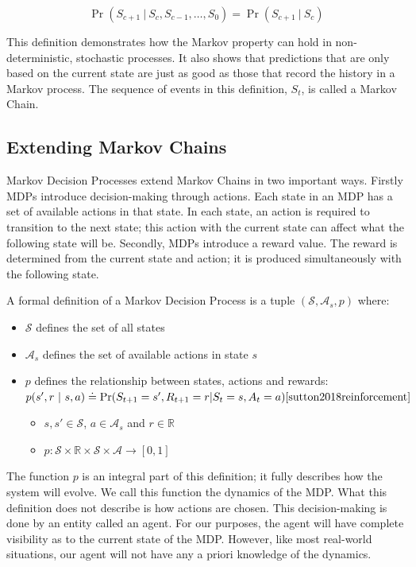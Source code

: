 \documentclass[]{final_report}
\begin{document}
\begin{equation}
  \Pr(S_{c+1}\ |\ S_{c},S_{c-1},\dots,S_0) = \Pr(S_{c+1}\ |\ S_{c})
  \label{eqn:markov-property}
\end{equation}

This definition demonstrates how the Markov property can hold in non-deterministic, stochastic processes. It also shows that predictions that are only based on the current state are just as good as those that record the history in a Markov process. The sequence of events in this definition, $S_t$, is called a Markov Chain\cite{meyn2012markov}.

\subsection{Extending Markov Chains}

Markov Decision Processes extend Markov Chains in two important ways. Firstly MDPs introduce decision-making through actions. Each state in an MDP has a set of available actions in that state. In each state, an action is required to transition to the next state; this action with the current state can affect what the following state will be. Secondly, MDPs introduce a reward value. The reward is determined from the current state and action; it is produced simultaneously with the following state.

A formal definition of a Markov Decision Process is a tuple $(\mathcal{S},\mathcal{A}_s,p)$ where:
\begin{itemize}
  \item $\mathcal{S}$ defines the set of all states
  \item $\mathcal{A}_s$ defines the set of available actions in state $s$
  \item $p$ defines the relationship between states, actions and rewards: \\
        $p(s',r\ |\ s,a) \doteq \Pr(S_{t+1} = s', R_{t+1} = r | S_t = s, A_t = a)\cite{sutton2018reinforcement}$
        \begin{itemize}
          \item $s, s' \in \mathcal{S}$, $a \in \mathcal{A}_s$ and $r \in \mathbb{R}$
          \item $p: \mathcal{S} \times \mathbb{R} \times \mathcal{S} \times \mathcal{A} \rightarrow [0,1]$
        \end{itemize}
\end{itemize}

The function $p$ is an integral part of this definition; it fully describes how the system will evolve. We call this function the dynamics of the MDP. What this definition does not describe is how actions are chosen. This decision-making is done by an entity called an agent. For our purposes, the agent will have complete visibility as to the current state of the MDP. However, like most real-world situations, our agent will not have any a priori knowledge of the dynamics. 
\end{document}

